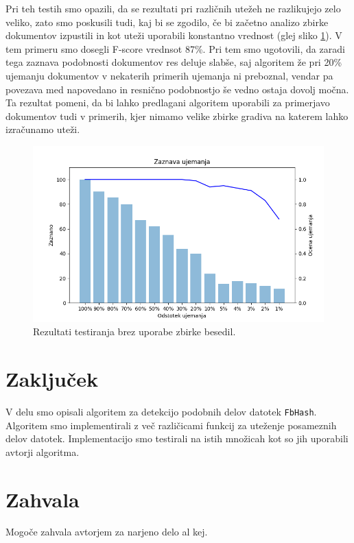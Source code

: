 \documentclass{acm_proc_article-sp}
\begin{document}
Pri teh testih smo opazili, da se rezultati pri različnih utežeh ne razlikujejo zelo veliko, zato smo poskusili tudi, kaj bi se zgodilo, če bi začetno analizo zbirke dokumentov izpustili in kot uteži uporabili konstantno vrednost (glej sliko \ref{fig:brezZbirke}). V tem primeru smo dosegli F-score vrednsot 87\%. Pri tem smo ugotovili, da zaradi tega zaznava podobnosti dokumentov res deluje slabše, saj algoritem že pri 20\% ujemanju dokumentov v nekaterih primerih ujemanja ni preboznal, vendar pa povezava med napovedano in resnično podobnostjo še vedno ostaja dovolj močna. Ta rezultat pomeni, da bi lahko predlagani algoritem uporabili za primerjavo dokumentov tudi v primerih, kjer nimamo velike zbirke gradiva na katerem lahko izračunamo uteži.

\begin{figure}[htb]
\begin{center}
\includegraphics[width=1\columnwidth]{brez_courpusa.png}
\end{center}
\caption{\small{Rezultati testiranja brez uporabe zbirke besedil.}}
\label{fig:brezZbirke}
\end{figure}

\FloatBarrier


\section{Zaklju\v{c}ek}
V delu smo opisali algoritem za detekcijo podobnih delov datotek \texttt{FbHash}. Algoritem smo implementirali z več različicami funkcij za uteženje posameznih delov datotek. Implementacijo smo testirali na istih množicah kot so jih uporabili avtorji algoritma. 

\section{Zahvala}
Mogoče zahvala avtorjem za narjeno delo al kej.




\balancecolumns
\end{document}
